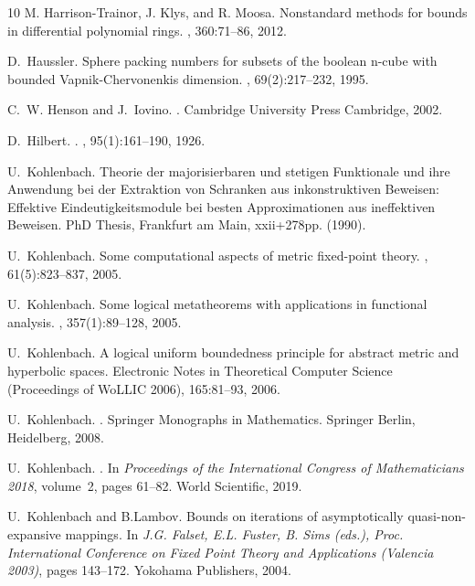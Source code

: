 \documentclass[11pt]{amsart}
\theoremstyle{definition}
\theoremstyle{remark}
\begin{document}
\begin{thebibliography}{10}
M. Harrison-Trainor, J. Klys, and R. Moosa.
\newblock Nonstandard methods for bounds in differential polynomial rings.
, 360:71--86, 2012.

D.~Haussler.
\newblock Sphere packing numbers for subsets of the boolean n-cube with bounded Vapnik-Chervonenkis dimension.
, 69(2):217--232,
  1995.

C.~W. Henson and J.~Iovino.
.
\newblock Cambridge University Press Cambridge, 2002.

D.~Hilbert.
.
, 95(1):161--190, 1926.

 U.~Kohlenbach. Theorie der majorisierbaren 
und stetigen Funktionale und ihre Anwendung bei der Extraktion von 
Schranken aus inkonstruktiven Beweisen: Effektive Eindeutigkeitsmodule 
bei besten Approximationen aus ineffektiven Beweisen. PhD Thesis, 
Frankfurt am Main, xxii+278pp. (1990). 

U.~Kohlenbach.
\newblock Some computational aspects of metric fixed-point theory.
,
  61(5):823--837, 2005.

U.~Kohlenbach.
\newblock Some logical metatheorems with applications in functional analysis.
,
  357(1):89--128, 2005.

 U.~Kohlenbach.  A logical uniform boundedness 
principle for abstract metric and hyperbolic spaces. 
Electronic Notes in Theoretical Computer Science (Proceedings of WoLLIC 2006), 
165:81--93, 2006.  
  
U.~Kohlenbach.
.
\newblock Springer Monographs in Mathematics. Springer Berlin, Heidelberg,
  2008.

U.~Kohlenbach.
.
\newblock In {\em Proceedings of the International Congress of Mathematicians
  2018}, volume~2, pages 61--82. World Scientific, 2019.

U.~Kohlenbach and B.Lambov.
\newblock Bounds on iterations of asymptotically quasi-non-expansive mappings.
\newblock In {\em J.G. Falset, E.L. Fuster, B. Sims (eds.), Proc. International
  Conference on Fixed Point Theory and Applications (Valencia 2003)}, pages
  143--172. Yokohama Publishers, 2004.


\end{thebibliography}
\end{document}
